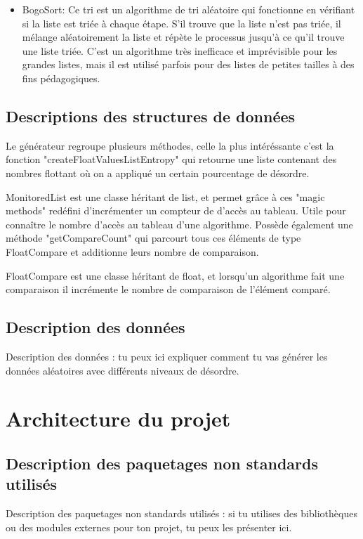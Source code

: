 \documentclass[10pt,a4paper]{article}
\begin{document}
\begin{itemize}
        \item BogoSort: Ce tri est un algorithme de tri aléatoire qui fonctionne en vérifiant si la liste est triée à chaque étape. S'il trouve que la liste n'est pas triée, il mélange aléatoirement la liste et répète le processus jusqu'à ce qu'il trouve une liste triée. C'est un algorithme très inefficace et imprévisible pour les grandes listes, mais il est utilisé parfois pour des listes de petites tailles à des fins pédagogiques.
    
      \end{itemize}
    
    \subsection{Descriptions des structures de données}

    Le générateur regroupe plusieurs méthodes, celle la plus intéréssante c'est la fonction "createFloatValuesListEntropy" qui retourne une liste contenant des nombres flottant où on a appliqué un certain pourcentage de désordre. 

    MonitoredList est une classe héritant de list, et permet grâce à ces "magic methods" redéfini d'incrémenter un compteur de d'accès au tableau. Utile pour connaître le nombre d'accès au tableau d'une algorithme. Possède également une méthode "getCompareCount" qui parcourt tous ces éléments de type FloatCompare et additionne leurs nombre de comparaison.

    FloatCompare est une classe héritant de float, et lorsqu'un algorithme fait une comparaison il incrémente le nombre de comparaison de l'élément comparé.

    
    
    \subsection{Description des données}
    Description des données : tu peux ici expliquer comment tu vas générer les données aléatoires avec différents niveaux de désordre.
    
\section{Architecture du projet}
    \subsection{Description des paquetages non standards utilisés}
    Description des paquetages non standards utilisés : si tu utilises des bibliothèques ou des modules externes pour ton projet, tu peux les présenter ici.
\end{document}
